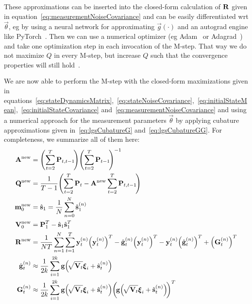 	These approximations can be inserted into the closed-form calculation of \(\boldsymbol{\mathrm{R}}\) given in equation~\eqref{eq:measurementNoiseCovariance} and can be easily differentiated \ac{wrt} \(\vec{\theta}\), \ac{eg} by using a neural network for approximating \(\vec{g}(\cdot)\) and an autograd engine like PyTorch~\cite{paszkePyTorchImperativeStyle2019}. Then we can use a numerical optimizer (\ac{eg} Adam~\cite{kingmaAdamMethodStochastic2017} or Adagrad~\cite{duchiAdaptiveSubgradientMethods2011}) and take one optimization step in each invocation of the M-step. That way we do not maximize \(Q\) in every M-step, but increase \(Q\) such that the convergence properties will still hold~\cite{moonExpectationmaximizationAlgorithm1996}.

	We are now able to perform the M-step with the closed-form maximizations given in equations~\eqref{eq:stateDynamicsMatrix},~\eqref{eq:stateNoiseCovariance},~\eqref{eq:initialStateMean},~\eqref{eq:initialStateCovariance} and~\eqref{eq:measurementNoiseCovariance} and using a numerical approach for the measurement parameters \(\vec{\theta}\) by applying cubature approximations given in~\eqref{eq:lgsCubatureG} and~\eqref{eq:lgsCubatureGG}. For completeness, we summarize all of them here:
	\begin{align*}
		\mat{A}^\new &= \Bigg(\! \sum_{t = 2}^{T} \mat{P}_{t, t - 1} \!\Bigg) \Bigg(\! \sum_{t = 2}^{T} \mat{P}_{t - 1} \!\Bigg)^{-1} \\
		\mat{Q}^\new &= \frac{1}{T - 1} \Bigg(\! \sum_{t = 2}^{T} \mat{P}_t - \mat{A}^\new \sum_{t = 2}^{T} \mat{P}_{t, t - 1} \!\Bigg) \\
		\vec{m}_0^\new &= \hat{\vec{s}}_1 = \frac{1}{N} \sum_{n = 0}^{N} \hat{\vec{s}}_1^{(n)} \\
		\mat{V}_0^\new &= \mat{P}_1^T - \hat{\vec{s}}_1 \hat{\vec{s}}_1^T \\
		\mat{R}^\new &= \frac{1}{NT} \sum_{n = 1}^{N} \sum_{t = 1}^{T} \vec{y}_t^{(n)} \Big(\vec{y}_t^{(n)}\Big)^T - \hat{\vec{g}}_t^{(n)} \Big(\vec{y}_t^{(n)}\Big)^T - \vec{y}_t^{(n)} \Big(\hat{\vec{g}}_t^{(n)}\Big)^T + \Big(\mat{G}_t^{(n)}\Big)^T \\
		\hat{\vec{g}}_t^{(n)} &\approx \frac{1}{2k} \sum_{i = 1}^{2k} \vec{g}\Big(\!\sqrt{\mat{V}_t} \vec{\xi}_i + \hat{\vec{s}}_t^{(n)}\Big) \\
		\mat{G}_t^{(n)} &\approx \frac{1}{2k} \sum_{i = 1}^{2k} \vec{g}\Big(\!\sqrt{\mat{V}_t} \vec{\xi}_i + \hat{\vec{s}}_t^{(n)}\Big) \bigg(\!\vec{g}\Big(\!\sqrt{\mat{V}_t} \vec{\xi}_i + \hat{\vec{s}}_t^{(n)}\Big)\!\bigg)^T
	\end{align*}

